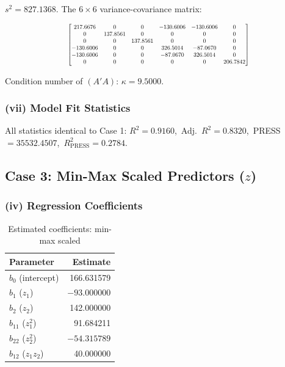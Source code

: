 \documentclass[12pt,a4paper]{article}
\begin{document}
$s^2 = 827.1368$. The $6 \times 6$ variance-covariance matrix:

\[
\scalebox{0.68}{$
\begin{bmatrix}
 217.6676 &        0 &        0 & -130.6006 & -130.6006 &        0 \\
        0 & 137.8561 &        0 &         0 &         0 &        0 \\
        0 &        0 & 137.8561 &         0 &         0 &        0 \\
-130.6006 &        0 &        0 &  326.5014 &  -87.0670 &        0 \\
-130.6006 &        0 &        0 &  -87.0670 &  326.5014 &        0 \\
        0 &        0 &        0 &         0 &         0 & 206.7842
\end{bmatrix}
$}
\]

Condition number of $(A'A)$: $\kappa = 9.5000$.

\subsubsection{(vii) Model Fit Statistics}

All statistics identical to Case 1:
$R^2 = 0.9160$,\ Adj.\ $R^2 = 0.8320$,\ PRESS $= 35532.4507$,\ $R^2_{\text{PRESS}} = 0.2784$.

\subsection{Case 3: Min-Max Scaled Predictors ($z$)}

\subsubsection{(iv) Regression Coefficients}

\begin{table}[H]
\centering
\caption{Estimated coefficients: min-max scaled}
\begin{tabular}{lr}
\toprule
Parameter & Estimate \\
\midrule
$b_0$ (intercept)     &  166.631579 \\
$b_1$ ($z_1$)         & $-93.000000$ \\
$b_2$ ($z_2$)         &  142.000000 \\
$b_{11}$ ($z_1^2$)    &   91.684211 \\
$b_{22}$ ($z_2^2$)    & $-54.315789$ \\
$b_{12}$ ($z_1 z_2$)  &   40.000000 \\
\bottomrule
\end{tabular}
\end{table}
\end{document}
